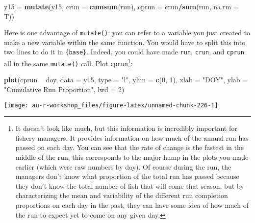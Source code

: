 \documentclass[]{book}
\newenvironment{Shaded}{\begin{snugshade}}{\end{snugshade}}
\newcommand{\KeywordTok}[1]{\textcolor[rgb]{0.13,0.29,0.53}{\textbf{#1}}}
\newcommand{\DataTypeTok}[1]{\textcolor[rgb]{0.13,0.29,0.53}{#1}}
\newcommand{\DecValTok}[1]{\textcolor[rgb]{0.00,0.00,0.81}{#1}}
\newcommand{\StringTok}[1]{\textcolor[rgb]{0.31,0.60,0.02}{#1}}
\newcommand{\OperatorTok}[1]{\textcolor[rgb]{0.81,0.36,0.00}{\textbf{#1}}}
\newcommand{\NormalTok}[1]{#1}
\let\rmarkdownfootnote\footnote%
\def\footnote{\protect\rmarkdownfootnote}
\theoremstyle{definition}
\theoremstyle{definition}
\theoremstyle{definition}
\theoremstyle{remark}
\begin{document}
\begin{Shaded}
\begin{Highlighting}[]
\NormalTok{y15 =}\StringTok{ }\KeywordTok{mutate}\NormalTok{(y15, }\DataTypeTok{crun =} \KeywordTok{cumsum}\NormalTok{(run), }\DataTypeTok{cprun =}\NormalTok{ crun}\OperatorTok{/}\KeywordTok{sum}\NormalTok{(run, }\DataTypeTok{na.rm =}\NormalTok{ T))}
\end{Highlighting}
\end{Shaded}

Here is one advantage of \texttt{mutate()}: you can refer to a variable
you just created to make a new variable within the same function. You
would have to split this into two lines to do it in \texttt{\{base\}}.
Indeed, you could have made \texttt{run}, \texttt{crun}, and
\texttt{cprun} all in the same \texttt{mutate()} call. Plot
\texttt{cprun}\footnote{It doesn't look like much, but this information
  is incredibly important for fishery managers. It provides information
  on how much of the annual run has passed on each day. You can see that
  the rate of change is the fastest in the middle of the run, this
  corresponds to the major hump in the plots you made earlier (which
  were raw numbers by day). Of course during the run, the managers don't
  know what proportion of the total run has passed because they don't
  know the total number of fish that will come that season, but by
  characterizing the mean and variability of the different run
  completion proportions on each day in the past, they can have some
  idea of how much of the run to expect yet to come on any given day.}:

\begin{Shaded}
\begin{Highlighting}[]
\KeywordTok{plot}\NormalTok{(cprun }\OperatorTok{~}\StringTok{ }\NormalTok{doy, }\DataTypeTok{data =}\NormalTok{ y15, }\DataTypeTok{type =} \StringTok{"l"}\NormalTok{, }\DataTypeTok{ylim =} \KeywordTok{c}\NormalTok{(}\DecValTok{0}\NormalTok{, }\DecValTok{1}\NormalTok{),}
     \DataTypeTok{xlab =} \StringTok{"DOY"}\NormalTok{, }\DataTypeTok{ylab =} \StringTok{"Cumulative Run Proportion"}\NormalTok{, }\DataTypeTok{lwd =} \DecValTok{2}\NormalTok{)}
\end{Highlighting}
\end{Shaded}

\begin{center}\texttt{[image: au-r-workshop\_files/figure-latex/unnamed-chunk-226-1]} \end{center}
\end{document}
